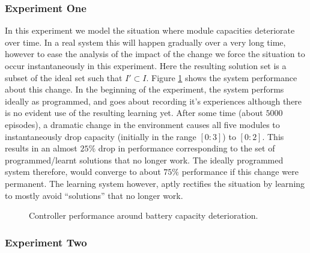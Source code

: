 \subsubsection{Experiment One}


In this experiment we model the situation where module capacities deteriorate over time. In a real system this will happen gradually over a very long time, however to ease the analysis of the impact of the change we force the situation to occur instantaneously in this experiment. Here the resulting solution set is a subset of the ideal set such that $I' \subset I$. Figure \ref{fig:experiment1} shows the system performance about this change. In the beginning of the experiment, the system performs ideally as programmed, and goes about recording it's experiences although there is no evident use of the resulting learning yet. After some time (about $5000$ episodes), a dramatic change in the environment causes all five modules to instantaneously drop capacity (initially in the range $[0:3]$) to $[0:2]$. This results in an almost $25\%$ drop in performance corresponding to the set of programmed/learnt solutions that no longer work. The ideally programmed system therefore, would converge to about $75\%$ performance if this change were permanent. The learning system however, aptly rectifies the situation by learning to mostly avoid ``solutions'' that no longer work. 



\begin{figure}[ht]
\begin{center}

\end{center}
\caption{Controller performance around battery capacity deterioration.}
\label{fig:experiment1}
\end{figure}

\subsubsection{Experiment Two}



